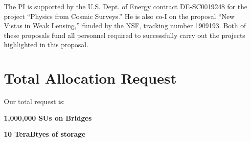 \documentclass[12pt]{article}
\begin{document}
\begin{small}
The PI is supported by the U.S. Dept. of Energy contract DE-SC0019248 for the project ``Physics from Cosmic Surveys.'' He is also co-I on the proposal ``New Vistas in Weak Lensing,'' funded by the NSF, tracking number 1909193. Both of these proposals fund all personnel required to successfully carry out the projects highlighted in this proposal.

\section{Total Allocation Request}

Our total request is:

{\bf 1,000,000 SUs on Bridges}

{\bf 10 TeraBtyes of storage}

\end{small}




\end{document}
